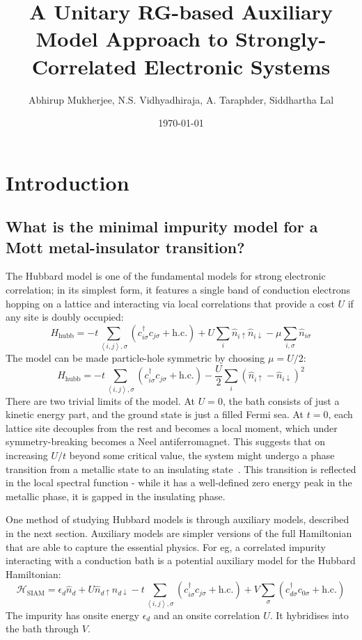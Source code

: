 \documentclass{report}
\title{\bf A Unitary RG-based Auxiliary Model Approach to Strongly-Correlated Electronic Systems}
\author{Abhirup Mukherjee, N.S. Vidhyadhiraja, A. Taraphder, Siddhartha Lal}
\date{\today}
\numberwithin{equation}{section}
\begin{document}
\maketitle
\tableofcontents
\newpage
\chapter{Introduction}

\section{What is the minimal impurity model for a Mott metal-insulator transition?}
\label{sec:min_model}
The Hubbard model is one of the fundamental models for strong electronic correlation; in its simplest form, it features a single band of conduction electrons hopping on a lattice and interacting via local correlations that provide a cost \(U\) if any site is doubly occupied:
\[H_\text{hubb} = -t\sum_{\left<i,j \right>,\sigma}\left(c^\dagger_{i\sigma}c_{j\sigma}+\text{h.c.}\right) + U\sum_i \hat n_{i \uparrow} \hat n_{i \downarrow} - \mu \sum_{i,\sigma}\hat n_{i\sigma}\]
The model can be made particle-hole symmetric by choosing \(\mu = U/2\):
\[H_\text{hubb} = -t\sum_{\left<i,j \right>,\sigma}\left(c^\dagger_{i\sigma}c_{j\sigma}+\text{h.c.}\right) - \frac{U}{2}\sum_i \left(\hat n_{i \uparrow} - \hat n_{i \downarrow}\right)^2\]
There are two trivial limits of the model. At \(U=0\), the bath consists of just a kinetic energy part, and the ground state is just a filled Fermi sea. At \(t=0\), each lattice site decouples from the rest and becomes a local moment, which under symmetry-breaking becomes a Neel antiferromagnet. This suggests that on increasing \(U/t\) beyond some critical value, the system might undergo a phase transition from a metallic state to an insulating state~\cite{Mott_1949}. This transition is reflected in the local spectral function - while it has a well-defined zero energy peak in the metallic phase, it is gapped in the insulating phase.

One method of studying Hubbard models is through auxiliary models, described in the next section. Auxiliary models are simpler versions of the full Hamiltonian that are able to capture the essential physics. For eg, a correlated impurity interacting with a conduction bath is a potential auxiliary model for the Hubbard Hamiltonian:
\begin{equation}
\label{clus_bath_siam}
\mathcal{H}_\text{SIAM} = \epsilon_d \hat n_d + U \hat n_{d \uparrow} \hat n_{d \downarrow} - t\sum_{\left<i,j \right>, \sigma}\left(c^\dagger_{i\sigma}c_{j\sigma} + \text{h.c.}\right) + V\sum_\sigma \left( c^\dagger_{d\sigma}c_{0\sigma} + \text{h.c.}\right) 
\end{equation}
The impurity has onsite energy \(\epsilon_d\) and an onsite correlation \(U\). It hybridises into the bath through \(V\).
\end{document}
